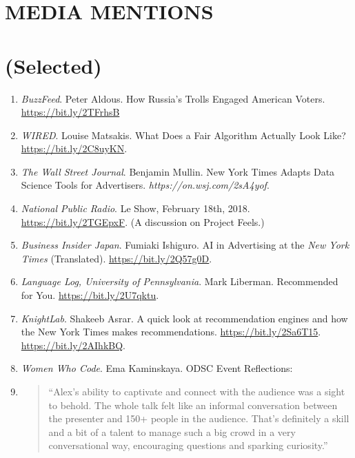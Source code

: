 \documentclass[margin]{res}
\newcommand{\fullhrulefill}{%
	\vspace{.7\baselineskip}
	\hspace*{-\sectionwidth}\hrulefill%
}
\begin{document}
\begin{resume}
\vspace{1\baselineskip}
\section{MEDIA MENTIONS}
\vspace{1\baselineskip}
\fullhrulefill
\section{(Selected)}
\begin{enumerate}
	\item \textit{BuzzFeed}. Peter Aldous. How Russia's Trolls Engaged American Voters. \url{https://bit.ly/2TFrhsB}
	\item \textit{WIRED}. Louise Matsakis. What Does a Fair Algorithm Actually Look Like? \url{https://bit.ly/2C8uyKN}.
	\item \textit{The Wall Street Journal}. Benjamin Mullin. New York Times Adapts Data Science Tools for Advertisers.  \textit{https://on.wsj.com/2sA4yof}.
	\item \textit{National Public Radio}. Le Show, February 18th, 2018. \url{https://bit.ly/2TGEpxF}. (A discussion on Project Feels.)
	\item \textit{Business Insider Japan}. Fumiaki Ishiguro. AI in Advertising at the \textit{New York Times} (Translated). \url{https://bit.ly/2Q57g0D}.
	\item \textit{Language Log, University of Pennsylvania}. Mark Liberman. Recommended for You. \url{https://bit.ly/2U7qktu}.
	\item \textit{KnightLab}. Shakeeb Asrar. A quick look at recommendation engines and how the New York Times makes recommendations. \url{https://bit.ly/2Sa6T15}.
	\url{https://bit.ly/2AIhkBQ}.
	\item \textit{Women Who Code}. Ema Kaminskaya. ODSC Event Reflections:
	\item[] \begin{quote}
			``Alex’s ability to captivate and connect with the audience was a sight to behold. The whole talk felt like an informal conversation between the presenter and 150+ people in the audience. That’s definitely a skill and a bit of a talent to manage such a big crowd in a very conversational way, encouraging questions and sparking curiosity.''%
		\end{quote}
\end{enumerate}

\end{resume}
\end{document}
